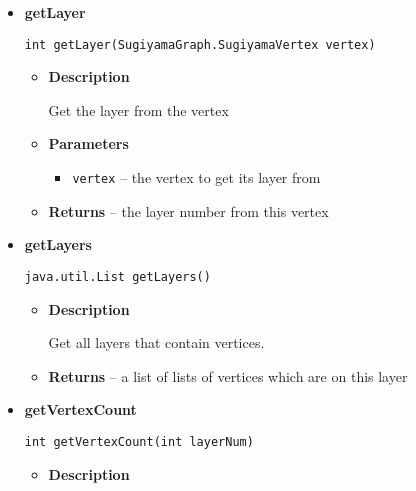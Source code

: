 {{{{{{{{{{{\begin{itemize}
{\begin{itemize}
{Get all vertices from a certain layer.
}
\item{
{\bf  Parameters}
  \begin{itemize}
   \item{
\texttt{layerNum} -- the layer number to get all vertices from}
  \end{itemize}
}%
\item{{\bf  Returns} -- 
a list of all vertices which are on this layer 
}%
\end{itemize}
}%
\item{ 
{\bf  getLayer}\\
\begin{lstlisting}[frame=none]
int getLayer(SugiyamaGraph.SugiyamaVertex vertex)\end{lstlisting} %
\begin{itemize}
\item{
{\bf  Description}

Get the layer from the vertex
}
\item{
{\bf  Parameters}
  \begin{itemize}
   \item{
\texttt{vertex} -- the vertex to get its layer from}
  \end{itemize}
}%
\item{{\bf  Returns} -- 
the layer number from this vertex 
}%
\end{itemize}
}%
\item{ 
{\bf  getLayers}\\
\begin{lstlisting}[frame=none]
java.util.List getLayers()\end{lstlisting} %
\begin{itemize}
\item{
{\bf  Description}

Get all layers that contain vertices.
}
\item{{\bf  Returns} -- 
a list of lists of vertices which are on this layer 
}%
\end{itemize}
}%
\item{ 
{\bf  getVertexCount}\\
\begin{lstlisting}[frame=none]
int getVertexCount(int layerNum)\end{lstlisting} %
\begin{itemize}
\item{
{\bf  Description}

}
\end{itemize}}
\end{itemize}}}}}}}}}}}}
